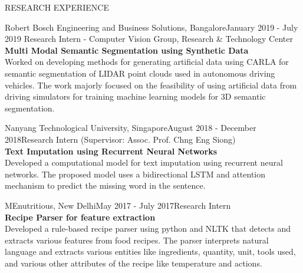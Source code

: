 \documentclass{resume} %
\begin{document}
\pagebreak

\begin{rSection}{RESEARCH EXPERIENCE}

\begin{rSubsection}{Robert Bosch Engineering and Business Solutions, Bangalore}{January 2019 - July 2019}
{Research Intern - Computer Vision Group, Research \& Technology Center}{}
\\{\bf Multi Modal Semantic Segmentation using Synthetic Data}\\
Worked on developing methods for generating artificial data using CARLA for semantic segmentation of LIDAR point clouds used in autonomous driving vehicles. The work majorly focused on the feasibility of using artificial data from driving simulators for training machine learning models for 3D semantic segmentation. 
\end{rSubsection}

\begin{rSubsection}{Nanyang Technological University, Singapore}{August 2018 - December 2018}{Research Intern (Supervisor: Assoc. Prof. Chng Eng Siong)}{}
\\{\bf Text Imputation using Recurrent Neural Networks}
\\ Developed a computational model for text imputation using recurrent neural networks. The proposed model uses a bidirectional LSTM and attention mechanism to predict the missing word in the sentence. 
 
\end{rSubsection} 



\begin{rSubsection}{MEnutritious, New Delhi}{May 2017 - July 2017}{Research Intern}{}
\\{\bf Recipe Parser for feature extraction}
\\ Developed a rule-based recipe parser using python and NLTK that detects and extracts various features from food recipes. The parser interprets natural language and extracts various entities like ingredients, quantity, unit, tools used, and various other attributes of the recipe like temperature and actions.
\end{rSubsection}
\end{rSection} 
\end{document}
